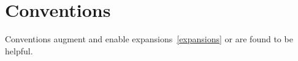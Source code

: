 \section{Conventions}
\label{conventions}

Conventions augment and enable expansions~\ref{expansions} or are found to be helpful.




